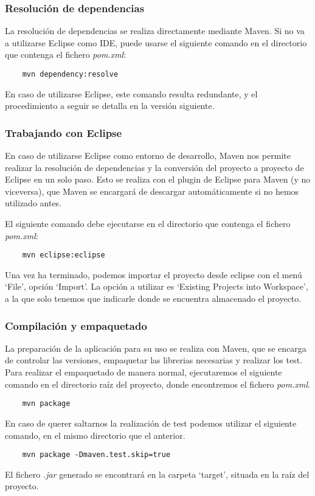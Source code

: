 
\subsubsection{Resolución de dependencias}
La resolución de dependencias se realiza directamente mediante Maven.
Si no va a utilizarse Eclipse como IDE, puede usarse el siguiente comando en el directorio que contenga el fichero \emph{pom.xml}:
\begin{verbatim}
	mvn dependency:resolve
\end{verbatim}
En caso de utilizarse Eclipse, este comando resulta redundante, y el procedimiento a seguir se detalla en la versión siguiente.

\subsubsection{Trabajando con Eclipse}
En caso de utilizarse Eclipse como entorno de desarrollo, Maven nos permite realizar la resolución de dependencias y la conversión del proyecto a proyecto de Eclipse en un solo paso.
Esto se realiza con el plugin de Eclipse para Maven (y no viceversa), que Maven se encargará de descargar automáticamente si no hemos utilizado antes.

El siguiente comando debe ejecutarse en el directorio que contenga el fichero \emph{pom.xml}:
\begin{verbatim}
	mvn eclipse:eclipse
\end{verbatim}
Una vez ha terminado, podemos importar el proyecto desde eclipse con el menú `File', opción `Import'.
La opción a utilizar es `Existing Projects into Workspace', a la que solo tenemos que indicarle donde se encuentra almacenado el proyecto.

\subsubsection{Compilación y empaquetado}
La preparación de la aplicación para su uso se realiza con Maven, que se encarga de controlar las versiones, empaquetar las librerias necesarias y realizar los test.
Para realizar el empaquetado de manera normal, ejecutaremos el siguiente comando en el directorio raíz del proyecto, donde encontremos el fichero \emph{pom.xml}.
\begin{verbatim}
	mvn package
\end{verbatim}
En caso de querer saltarnos la realización de test podemos utilizar el siguiente comando, en el mismo directorio que el anterior.
\begin{verbatim}
	mvn package -Dmaven.test.skip=true
\end{verbatim}
El fichero \emph{.jar} generado se encontrará en la carpeta `target', situada en la raíz del proyecto.